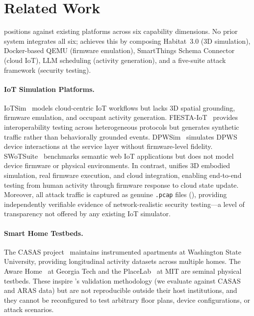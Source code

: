 \section{Related Work}\label{sec:related}



 positions \sys{} against existing
platforms across six capability dimensions.  No prior system
integrates all six; \sys{} achieves this by composing Habitat~3.0
(3D simulation), Docker-based QEMU (firmware emulation), SmartThings
Schema Connector (cloud IoT), LLM scheduling (activity generation),
and a five-suite attack framework (security testing).

\paragraph{IoT Simulation Platforms.}
IoTSim~\cite{iotsim} models cloud-centric IoT workflows but lacks 3D
spatial grounding, firmware emulation, and occupant activity generation.
FIESTA-IoT~\cite{fiesta-iot} provides interoperability testing across
heterogeneous protocols but generates synthetic traffic rather
than behaviorally grounded events.
DPWSim~\cite{dpwsim} simulates DPWS device interactions at the
service layer without firmware-level fidelity.
SWoTSuite~\cite{swotsuite} benchmarks semantic web IoT applications
but does not model device firmware or physical environments.
In contrast, \sys{} unifies 3D embodied simulation, real firmware
execution, and cloud integration, enabling end-to-end testing from
human activity through firmware response to cloud state update.
Moreover, all attack traffic is captured as genuine \texttt{.pcap}
files (), providing independently verifiable
evidence of network-realistic security testing---a level of
transparency not offered by any existing IoT simulator.

\paragraph{Smart Home Testbeds.}
The CASAS project~\cite{casas} maintains instrumented apartments
at Washington State University, providing longitudinal activity
datasets across multiple homes.  The Aware Home~\cite{aware-home}
at Georgia Tech and the PlaceLab~\cite{placelab} at MIT are seminal
physical testbeds.  These inspire \sys{}'s validation methodology
(we evaluate against CASAS and ARAS data) but are not reproducible
outside their host institutions, and they cannot be reconfigured to
test arbitrary floor plans, device configurations, or attack scenarios.

